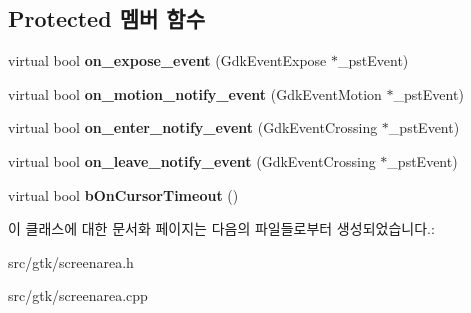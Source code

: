 \subsection*{Protected 멤버 함수}
\begin{DoxyCompactItemize}
\item 
\mbox{\label{class_v_b_a_1_1_screen_area_ab800ac1ff230ac9cf33ac144e614160e}} 
virtual bool {\bfseries on\+\_\+expose\+\_\+event} (Gdk\+Event\+Expose $\ast$\+\_\+pst\+Event)
\item 
\mbox{\label{class_v_b_a_1_1_screen_area_a3a341c2aa9a29f33e16923073b43e3e6}} 
virtual bool {\bfseries on\+\_\+motion\+\_\+notify\+\_\+event} (Gdk\+Event\+Motion $\ast$\+\_\+pst\+Event)
\item 
\mbox{\label{class_v_b_a_1_1_screen_area_aa0bb4110528b060c4fb9a01ad868e4b5}} 
virtual bool {\bfseries on\+\_\+enter\+\_\+notify\+\_\+event} (Gdk\+Event\+Crossing $\ast$\+\_\+pst\+Event)
\item 
\mbox{\label{class_v_b_a_1_1_screen_area_a15325a7cba813d00e8b2638a6abf651f}} 
virtual bool {\bfseries on\+\_\+leave\+\_\+notify\+\_\+event} (Gdk\+Event\+Crossing $\ast$\+\_\+pst\+Event)
\item 
\mbox{\label{class_v_b_a_1_1_screen_area_a27266c7186e0d854759430c400d3e48a}} 
virtual bool {\bfseries b\+On\+Cursor\+Timeout} ()
\end{DoxyCompactItemize}


이 클래스에 대한 문서화 페이지는 다음의 파일들로부터 생성되었습니다.\+:\begin{DoxyCompactItemize}
\item 
src/gtk/screenarea.\+h\item 
src/gtk/screenarea.\+cpp\end{DoxyCompactItemize}
